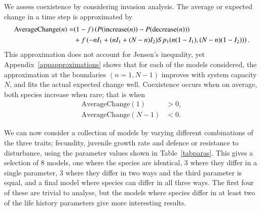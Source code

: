 We assess coexistence by considering invasion analysis. The average or expected change in a time step is approximated by
\begin{align}
\label{ac}
\text{AverageChange}(n)=&(1-f)\left(P(\text{increase}(n))-P(\text{decrease}(n))\right)  \\
&+f\left(-nI_1 +(nI_1+(N-n)I_2)Sp_1(n(1-I_1),(N-n)(1-I_2))\right).\notag
\end{align}
This approximation does not account for Jensen's inequality, yet Appendix~\ref{appapproximations} shows that for each of the models considered, the approximation at the boundaries $(n=1,N-1)$ improves with system capacity $N$, and fits the actual expected change well. Coexistence occurs when on average, both species increase when rare; that is when
\begin{align}
\label{avch1}\text{AverageChange}(1)&>0,\\
\label{avchn-1}\text{AverageChange}(N-1)&<0. \end{align}

We can now consider a collection of models by varying different combinations of the three traits; fecundity, juvenile growth rate and defence or resistance to disturbance, using the parameter values shown in Table~\ref{tabparas}. This gives a selection of 8 models, one where the species are identical, 3 where they differ in a single parameter, 3 where they differ in two ways and the third parameter is equal, and a final model where species can differ in all three ways. The first four of these are trivial to analyse, but the models where species differ in at least two of the life history parameters give more interesting results.

